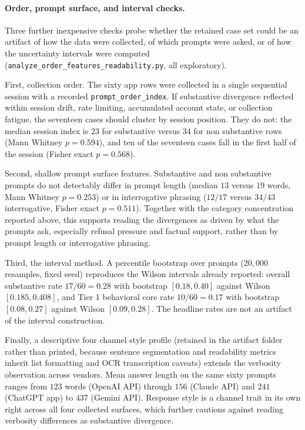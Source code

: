 \paragraph{Order, prompt surface, and interval checks.}
\label{sec:order-robustness}

Three further inexpensive checks probe whether the retained case set could be an
artifact of how the data were collected, of which prompts were asked, or of how
the uncertainty intervals were computed
(\texttt{analyze\_order\_features\_readability.py}, all exploratory).

First, collection order. The sixty app rows were collected in a single
sequential session with a recorded \texttt{prompt\_order\_index}. If substantive
divergence reflected within session drift, rate limiting, accumulated
account state, or collection fatigue, the seventeen cases should cluster by
session position. They do not: the median session index is $23$ for substantive
versus $34$ for non substantive rows (Mann Whitney $p=0.594$), and ten of the
seventeen cases fall in the first half of the session (Fisher exact $p=0.568$).

Second, shallow prompt surface features. Substantive and non substantive prompts
do not detectably differ in prompt length (median $13$ versus $19$ words,
Mann Whitney $p=0.253$) or in interrogative phrasing ($12/17$ versus $34/43$
interrogative, Fisher exact $p=0.511$). Together with the category concentration
reported above, this supports reading the divergences as driven by what the
prompts ask, especially refusal pressure and factual support, rather than by
prompt length or interrogative phrasing.



Third, the interval method. A percentile bootstrap over prompts ($20{,}000$
resamples, fixed seed) reproduces the Wilson intervals already reported: overall
substantive rate $17/60=0.28$ with bootstrap $[0.18,0.40]$ against Wilson
$[0.185,0.408]$, and Tier 1 behavioral core rate $10/60=0.17$ with bootstrap
$[0.08,0.27]$ against Wilson $[0.09,0.28]$. The headline rates are not an
artifact of the interval construction.

Finally, a descriptive four channel style profile (retained in the artifact
folder rather than printed, because sentence segmentation and readability
metrics inherit list formatting and OCR transcription caveats) extends the
verbosity observation across vendors. Mean answer length on the same sixty
prompts ranges from $123$ words (OpenAI API) through $156$ (Claude API) and
$241$ (ChatGPT app) to $437$ (Gemini API). Response style is a channel trait in
its own right across all four collected surfaces, which further cautions against
reading verbosity differences as substantive divergence.

